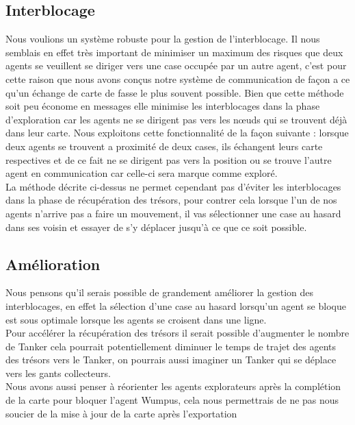 \documentclass[10pt]{article}
\newcommand\tab[1][0.65cm]{\hspace*{#1}}
\begin{document}
	
\subsection{Interblocage}
\tab Nous voulions un système robuste pour la gestion de l'interblocage. Il nous semblais en effet très important de minimiser un maximum des risques que deux agents se veuillent se diriger vers une case occupée par un autre agent, c'est pour cette raison que nous avons conçus notre système de communication de façon a ce qu'un échange de carte de fasse le plus souvent possible. Bien que cette méthode soit peu économe en messages elle minimise les interblocages dans la phase d'exploration car les agents ne se dirigent pas vers les nœuds qui se trouvent déjà dans leur carte. Nous exploitons cette fonctionnalité de la façon suivante : lorsque deux agents se trouvent a proximité de deux cases, ils échangent leurs carte respectives et de ce fait ne se dirigent pas vers la position ou se trouve l'autre agent en communication car celle-ci sera marque comme exploré.\\
\tab La méthode décrite ci-dessus ne permet cependant pas d'éviter les interblocages dans la phase de récupération des trésors, pour contrer cela lorsque l'un de nos agents n'arrive pas a faire un mouvement, il vas sélectionner une case au hasard dans ses voisin et essayer de s'y déplacer jusqu'à ce que ce soit possible.

\subsection{Amélioration}
Nous pensons qu'il serais possible de grandement améliorer la gestion des interblocages, en effet la sélection d'une case au hasard lorsqu'un agent se bloque est sous optimale lorsque les agents se croisent dans une ligne.\\
\tab Pour accélérer la récupération des trésors il serait possible d'augmenter le nombre de Tanker cela pourrait potentiellement diminuer le temps de trajet des agents des trésors vers le Tanker, on pourrais aussi imaginer un Tanker qui se déplace vers les gants collecteurs.\\
\tab Nous avons aussi penser à réorienter les agents explorateurs après la complétion de la carte pour bloquer l'agent Wumpus, cela nous permettrais de ne pas nous soucier de la mise à jour de la carte après l'exportation\\
\end{document}
